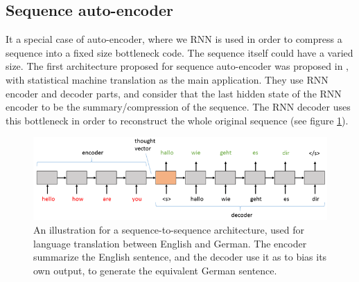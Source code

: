   \subsection{Sequence auto-encoder}
    It a special case of auto-encoder, where we RNN is used in order to compress a sequence into a fixed size bottleneck code. The sequence itself could have a varied size. The first architecture proposed for sequence auto-encoder was proposed in \citep{cho2014learning,sutskever2014sequence}, with statistical machine translation as the main application. They use RNN encoder and decoder parts, and consider that the last hidden state of the RNN encoder to be the summary/compression of the sequence. The RNN decoder uses this bottleneck in order to reconstruct the whole original sequence (see figure \ref{fig:seq2seq}).

    \begin{figure}
      \centering
      \includegraphics[scale=0.8]{images/framework/SequencetoS2.png}
      \caption{An illustration for a sequence-to-sequence architecture, used for language translation between English and German. The encoder summarize the English sentence, and the decoder use it as to bias its own output, to generate the equivalent German sentence.}
      \label{fig:seq2seq}
    \end{figure}

